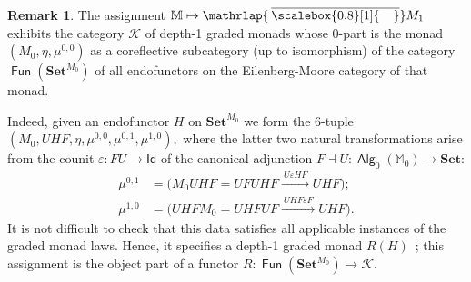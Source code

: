 \documentclass[sigconf,
			final%
			nonacm
                        ]{acmart}
\numberwithin{equation}{section}
\numberwithin{equation}{section}
\theoremstyle{plain}
\theoremstyle{definition}
\newtheorem{rem}[thm]{Remark}
\newcommand{\mybar}[3]{%
  \mathrlap{\hspace{#2}\overline{\scalebox{#1}[1]{\hphantom{\ensuremath{#3}}\vphantom{\rule{0pt}{5.5pt}}}}}\ensuremath{#3}
}
\newcommand{\barM}{\mybar{0.8}{2pt}{M}_1}
\DeclareMathOperator{\Fun}{\mathsf{Fun}}
\newcommand{\eps}{\varepsilon}
\newcommand{\xra}[1]{\xrightarrow{~#1~}}
\newcommand{\M}{\mathbb{M}}                   %
\newcommand{\K}{\mathscr{K}}
\newcommand{\Set}{\mathbf{Set}}
\DeclareMathOperator{\Alg}{\mathsf{Alg}}
\newcommand{\Id}{\mathsf{Id}}                 %
\begin{document}
\begin{rem}
  The assignment $\M \mapsto \barM$ exhibits the category $\K$ of
  depth-1 graded monads whose $0$-part is the monad
  $(M_0, \eta, \mu^{0,0})$ as a coreflective subcategory (up to
  isomorphism) of the category $\Fun(\Set^{M_0})$ of all endofunctors
  on the Eilenberg-Moore category of that monad.

  Indeed, given an endofunctor $H$ on $\Set^{M_0}$ we form the
  $6$-tuple
    $(M_0, UHF, \eta, \mu^{0,0}, \mu^{0,1},\mu^{1,0}),$
  where the latter two natural transformations arise from the counit
  $\eps\colon FU \to \Id$ of the canonical adjunction $F\dashv U\colon\Alg_0(\M_0)\to\Set$:
  \begin{align*}
    \mu^{0,1} &= (M_0UHF = UFUHF \xra{U\eps HF} UHF\big);\\
    \mu^{1,0} &= (UHFM_0 = UHFUF \xra{UHF\eps F} UHF\big).
  \end{align*}
  It is not difficult to check that this data satisfies all applicable
  instances of the graded monad laws. Hence, it specifies a
  depth-1 graded monad $R(H)$~\cite[Thm.~3.7]{DMS19}; this
  assignment is the object part of a functor $R\colon\Fun(\Set^{M_0})\to\K$.


\end{rem}
\end{document}
